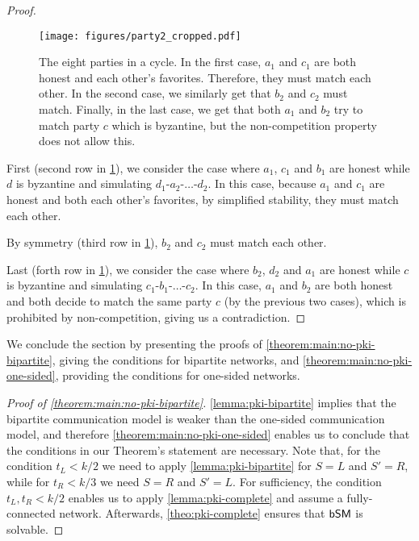 \begin{proof}
\begin{figure}[t]
\centering
\texttt{[image: figures/party2\_cropped.pdf]}
\setlength{\belowcaptionskip}{-10pt}
\caption{The eight parties in a cycle.
In the first case, $a_1$ and $c_1$ are both honest and each other's favorites. Therefore, they must match each other. In the second case, we similarly get that $b_2$ and $c_2$ must match. Finally, in the last case, we get that both $a_1$ and $b_2$ try to match party $c$ which is byzantine, but the non-competition property does not allow this.}
\label{fig:cycle}
\end{figure}

First (second row in \cref{fig:cycle}), we consider the case where $a_1$, $c_1$ and $b_1$ are honest while $d$ is byzantine and simulating $d_1$-$a_2$-$\dots$-$d_2$. In this case, because $a_1$ and $c_1$ are honest and both each other's favorites, by simplified stability, they must match each other.

By symmetry (third row in \cref{fig:cycle}), $b_2$ and $c_2$ must match each other.

Last (forth row in \cref{fig:cycle}), we consider the case where $b_2$, $d_2$ and $a_1$ are honest while $c$ is byzantine and simulating $c_1$-$b_1$-$\dots$-$c_2$. In this case, $a_1$ and $b_2$ are both honest and both decide to match the same party $c$ (by the previous two cases), which is prohibited by non-competition, giving us a contradiction.
\end{proof}

We conclude the section by presenting the proofs of \cref{theorem:main:no-pki-bipartite}, giving the conditions for bipartite networks, and \cref{theorem:main:no-pki-one-sided}, providing the conditions for one-sided networks.
\begin{proof}[Proof of \cref{theorem:main:no-pki-bipartite}]
\cref{lemma:pki-bipartite} implies that the bipartite communication model is weaker than the one-sided communication model, and therefore \cref{theorem:main:no-pki-one-sided} enables us to conclude that the conditions in our Theorem's statement are necessary. Note that, for the condition $t_L < k / 2$ we need to apply \cref{lemma:pki-bipartite} for $S = L$ and $S' = R$, while for $t_R < k / 3$ we need $S = R$ and $S' = L$. For sufficiency, the condition $t_L, t_R < k/2$ enables us to apply \cref{lemma:pki-complete} and assume a fully-connected network. Afterwards, \cref{theo:pki-complete} ensures that $\textsf{bSM}$ is solvable.
\end{proof}


